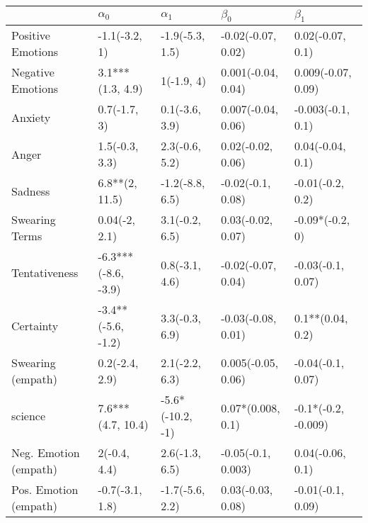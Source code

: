 \begin{tabular}{lllll}
\toprule
{} &           $\alpha_0$ &        $\alpha_1$ &           $\beta_0$ &            $\beta_1$ \\
\midrule
Positive Emotions     &        -1.1(-3.2, 1) &   -1.9(-5.3, 1.5) &  -0.02(-0.07, 0.02) &     0.02(-0.07, 0.1) \\
Negative Emotions     &     3.1***(1.3, 4.9) &        1(-1.9, 4) &  0.001(-0.04, 0.04) &   0.009(-0.07, 0.09) \\
Anxiety               &         0.7(-1.7, 3) &    0.1(-3.6, 3.9) &  0.007(-0.04, 0.06) &    -0.003(-0.1, 0.1) \\
Anger                 &       1.5(-0.3, 3.3) &    2.3(-0.6, 5.2) &   0.02(-0.02, 0.06) &     0.04(-0.04, 0.1) \\
Sadness               &       6.8**(2, 11.5) &   -1.2(-8.8, 6.5) &   -0.02(-0.1, 0.08) &     -0.01(-0.2, 0.2) \\
Swearing Terms        &        0.04(-2, 2.1) &    3.1(-0.2, 6.5) &   0.03(-0.02, 0.07) &      -0.09*(-0.2, 0) \\
Tentativeness         &  -6.3***(-8.6, -3.9) &    0.8(-3.1, 4.6) &  -0.02(-0.07, 0.04) &    -0.03(-0.1, 0.07) \\
Certainty             &   -3.4**(-5.6, -1.2) &    3.3(-0.3, 6.9) &  -0.03(-0.08, 0.01) &     0.1**(0.04, 0.2) \\
Swearing (empath)     &       0.2(-2.4, 2.9) &    2.1(-2.2, 6.3) &  0.005(-0.05, 0.06) &    -0.04(-0.1, 0.07) \\
science               &    7.6***(4.7, 10.4) &  -5.6*(-10.2, -1) &   0.07*(0.008, 0.1) &  -0.1*(-0.2, -0.009) \\
Neg. Emotion (empath) &         2(-0.4, 4.4) &    2.6(-1.3, 6.5) &  -0.05(-0.1, 0.003) &     0.04(-0.06, 0.1) \\
Pos. Emotion (empath) &      -0.7(-3.1, 1.8) &   -1.7(-5.6, 2.2) &   0.03(-0.03, 0.08) &    -0.01(-0.1, 0.09) \\
\bottomrule
\end{tabular}
